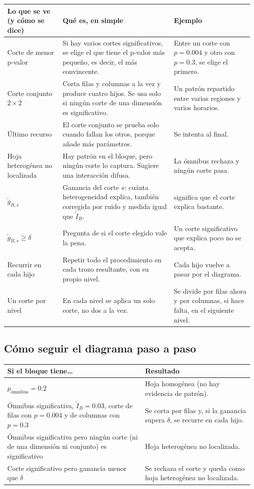 \documentclass[11pt,a4paper]{article}
\makeatletter
\newenvironment{partes}{%
  \begin{longtable}{@{}>{\raggedright\arraybackslash}p{4.3cm}>{\raggedright\arraybackslash}p{6.0cm}>{\raggedright\arraybackslash}p{5.0cm}@{}}
  \toprule \textbf{Lo que se ve (y cómo se dice)} & \textbf{Qué es, en simple} & \textbf{Ejemplo}\\ \midrule \endhead}{%
  \bottomrule\end{longtable}}
\newcommand{\se}[1]{\newline{\small\color{ucspblue}(se dice «#1»)}}
\makeatother
\begin{document}
\begin{partes}
Corte de menor p-valor \se{corte de menor pe valor} & Si hay varios cortes significativos, se elige el que tiene el p-valor más pequeño, es decir, el más convincente. & Entre un corte con $p=0.004$ y otro con $p=0.3$, se elige el primero. \\
Corte conjunto $2\times2$ \se{corte conjunto dos por dos} & Corta filas y columnas a la vez y produce cuatro hijos. Se usa solo si ningún corte de una dimensión es significativo. & Un patrón repartido entre varias regiones y varios horarios. \\
Último recurso & El corte conjunto se prueba solo cuando fallan los otros, porque añade más parámetros. & Se intenta al final. \\
Hoja heterogénea no localizada & Hay patrón en el bloque, pero ningún corte lo captura. Sugiere una interacción difusa. & La ómnibus rechaza y ningún corte pasa. \\
$\tilde g_{B,s}$ \se{g tilde de B, s} & Ganancia del corte $s$: cuánta heterogeneidad explica, también corregida por ruido y medida igual que $\tilde I_B$. & 0.08 significa que el corte explica bastante. \\
$\tilde g_{B,s}\ge\delta$ \se{g tilde de B, s mayor o igual que delta} & Pregunta de si el corte elegido vale la pena. & Un corte significativo que explica poco no se acepta. \\
Recurrir en cada hijo & Repetir todo el procedimiento en cada trozo resultante, con su propio nivel. & Cada hijo vuelve a pasar por el diagrama. \\
Un corte por nivel & En cada nivel se aplica un solo corte, no dos a la vez. & Se divide por filas ahora y por columnas, si hace falta, en el siguiente nivel. \\
\end{partes}

\subsection*{Cómo seguir el diagrama paso a paso}

\begin{center}
\small
\begin{tabular}{@{}p{7.0cm}p{8.0cm}@{}}
\toprule
Si el bloque tiene… & Resultado \\
\midrule
$p_{\text{ómnibus}}=0.2$ & Hoja homogénea (no hay evidencia de patrón). \\
Ómnibus significativa, $\tilde I_B=0.03$, corte de filas con $p=0.004$ y de columnas con $p=0.3$ & Se corta por filas y, si la ganancia supera $\delta$, se recurre en cada hijo. \\
Ómnibus significativa pero ningún corte (ni de una dimensión ni conjunto) es significativo & Hoja heterogénea no localizada. \\
Corte significativo pero ganancia menor que $\delta$ & Se rechaza el corte y queda como hoja heterogénea no localizada. \\
\bottomrule
\end{tabular}
\end{center}
\end{document}
